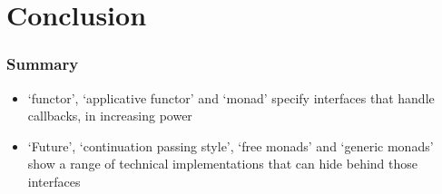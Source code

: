 \documentclass{beamer}
\begin{document}
\section{Conclusion}

\begin{frame}
\frametitle{Summary}
\begin{itemize}
\item `functor', `applicative functor' and `monad' specify interfaces that handle callbacks, in increasing power
\item `Future', `continuation passing style', `free monads' and `generic monads' show a range of technical implementations that can hide behind those interfaces
\end{itemize}

\end{frame}
\end{document}
